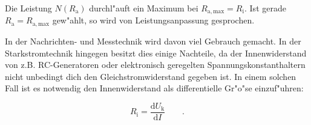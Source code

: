Die Leistung $N(R_\mathrm{a})$ durchl"auft ein Maximum bei $R_\mathrm{a,max} = R_\mathrm{i}$.
Ist gerade $R_\mathrm{a} = R_\mathrm{a,max}$ gew"ahlt, so wird von Leistungsanpassung gesprochen.

In der Nachrichten- und Messtechnik wird davon viel Gebrauch gemacht.
In der Starkstromtechnik hingegen besitzt dies einige Nachteile, da der Innenwiderstand von z.B. RC-Generatoren oder elektronisch geregelten Spannungskonstanthaltern nicht unbedingt dich den Gleichstromwiderstand gegeben ist.
In einem solchen Fall ist es notwendig den Innenwiderstand als differentielle Gr"o"se einzuf"uhren:

\begin{equation}
	R_\mathrm{i} = \frac{\mathrm{d}U_\mathrm{k}}{\mathrm{d}I} \qquad .
\end{equation}